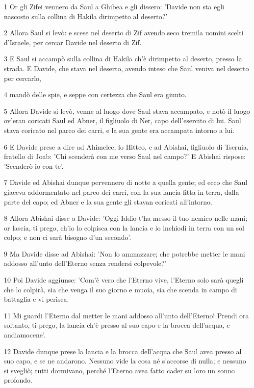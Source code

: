 \par 1 Or gli Zifei vennero da Saul a Ghibea e gli dissero: 'Davide non sta egli nascosto sulla collina di Hakila dirimpetto al deserto?'
\par 2 Allora Saul si levò: e scese nel deserto di Zif avendo seco tremila uomini scelti d'Israele, per cercar Davide nel deserto di Zif.
\par 3 E Saul si accampò sulla collina di Hakila ch'è dirimpetto al deserto, presso la strada. E Davide, che stava nel deserto, avendo inteso che Saul veniva nel deserto per cercarlo,
\par 4 mandò delle spie, e seppe con certezza che Saul era giunto.
\par 5 Allora Davide si levò, venne al luogo dove Saul stava accampato, e notò il luogo ov'eran coricati Saul ed Abner, il figliuolo di Ner, capo dell'esercito di lui. Saul stava coricato nel parco dei carri, e la sua gente era accampata intorno a lui.
\par 6 E Davide prese a dire ad Ahimelec, lo Hitteo, e ad Abishai, figliuolo di Tseruia, fratello di Joab: 'Chi scenderà con me verso Saul nel campo?' E Abishai rispose: 'Scenderò io con te'.
\par 7 Davide ed Abishai dunque pervennero di notte a quella gente; ed ecco che Saul giaceva addormentato nel parco dei carri, con la sua lancia fitta in terra, dalla parte del capo; ed Abner e la sua gente gli stavan coricati all'intorno.
\par 8 Allora Abishai disse a Davide: 'Oggi Iddio t'ha messo il tuo nemico nelle mani; or lascia, ti prego, ch'io lo colpisca con la lancia e lo inchiodi in terra con un sol colpo; e non ci sarà bisogno d'un secondo'.
\par 9 Ma Davide disse ad Abishai: 'Non lo ammazzare; che potrebbe metter le mani addosso all'unto dell'Eterno senza rendersi colpevole?'
\par 10 Poi Davide aggiunse: 'Com'è vero che l'Eterno vive, l'Eterno solo sarà quegli che lo colpirà, sia che venga il suo giorno e muoia, sia che scenda in campo di battaglia e vi perisca.
\par 11 Mi guardi l'Eterno dal metter le mani addosso all'unto dell'Eterno! Prendi ora soltanto, ti prego, la lancia ch'è presso al suo capo e la brocca dell'acqua, e andiamocene'.
\par 12 Davide dunque prese la lancia e la brocca dell'acqua che Saul avea presso al suo capo, e se ne andarono. Nessuno vide la cosa né s'accorse di nulla; e nessuno si svegliò; tutti dormivano, perché l'Eterno avea fatto cader su loro un sonno profondo.

